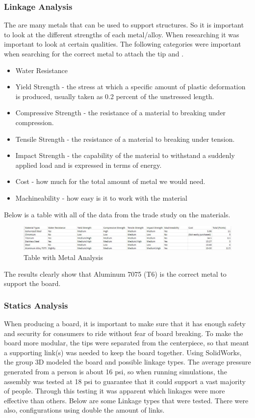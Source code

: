 \documentclass[titlepage, letterpaper,12pt]{article}
\begin{document}
\subsubsection{Linkage Analysis}
The are many metals that can be used to support structures. So it is important to look at the different strengths of each metal/alloy. When researching it was important to look at certain qualities. The following categories were important when searching for the correct metal to attach the tip and .
\begin{itemize}
\item Water Resistance
\item Yield Strength - the stress at which a specific amount of plastic deformation is produced, usually taken as 0.2 percent of the unstressed length.
\item Compressive Strength - the resistance of a material to breaking under compression.
\item Tensile Strength - the resistance of a material to breaking under tension.
\item Impact Strength - the capability of the material to withstand a suddenly applied load and is expressed in terms of energy.
\item Cost - how much for the total amount of metal we would need.
\item Machineability - how easy is it to work with the material
\end{itemize}
Below is a table with all of the data from the trade study on the materials.
\begin{figure}[!htbp]\centering
  \includegraphics[width=\linewidth]{metals.JPG}
  \caption{Table with Metal Analysis}
  \label{metals}
\end{figure}
\newline
The results clearly show that Aluminum 7075 (T6) is the correct metal to support the board.

\subsubsection{Statics Analysis}
When producing a board, it is important to make sure that it has enough safety and security for consumers to ride without fear of board breaking. To make the board more modular, the tips were separated from the centerpiece, so that meant a supporting link(s) was needed to keep the board together. Using SolidWorks, the group 3D modeled the board and possible linkage types. The average pressure generated from a person is about 16 psi, so when running simulations, the assembly was tested at 18 psi to guarantee that it could support a vast majority of people. Through this testing it was apparent which linkages were more effective than others.
\newline
Below are some Linkage types that were tested. There were also, configurations using double the amount of links.
\end{document}
